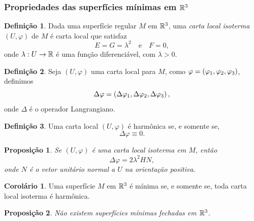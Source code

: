 \documentclass[12pt,a4paper]{beamer}
\newtheorem{proposicao}{Proposição}
\theoremstyle{definition}
\newtheorem{definicao}{Definição}
\newtheorem{corolario}{Corolário}
\begin{document}
\begin{frame}[allowframebreaks]
	\frametitle{Propriedades das superfícies mínimas em $\mathbb R^3$}
	
	\begin{definicao}
		Dada uma superfície regular $M$ em $\mathbb R^3$, uma \emph{carta local isoterma} $(U, \varphi)$ de $M$ é carta local que satisfaz
		\begin{equation*}
		E = G = \lambda^2 \quad \text{e} \quad F=0,
		\end{equation*}
		onde $\lambda: U \rightarrow \mathbb R$ é uma função diferenciável, com $\lambda > 0$.
	\end{definicao}
	
	\begin{definicao}
		Seja $(U, \varphi)$ uma carta local para $M$, como $\varphi = \left( \varphi_1, \varphi_2, \varphi_3 \right)$, definimos
		\begin{equation*}
		\Delta \varphi = \left( \Delta \varphi_1, \Delta \varphi_2, \Delta \varphi_3 \right),
		\end{equation*}
		onde $\Delta$ é o operador Langrangiano.
	\end{definicao}

	\begin{definicao}
		Uma carta local $(U,\varphi)$ é harmônica se, e somente se,
		\begin{equation*}
		\Delta \varphi \equiv 0.
		\end{equation*}
	\end{definicao}
	
	\begin{proposicao}
		Se $(U, \varphi)$ é uma carta local isoterma em $M$, então 
		\begin{equation*}
		\Delta \varphi = 2 \lambda^2 H N,
		\end{equation*}
		onde $N$ é o vetor unitário normal a $U$ na orientação positiva.
	\end{proposicao}
	
	\begin{corolario}
		Uma superfície $M$ em $\mathbb R^3$ é mínima se, e somente se, toda carta local isoterma é harmônica.
	\end{corolario}

	\begin{proposicao}
		Não existem superfícies mínimas fechadas em $\mathbb R^3$.
	\end{proposicao}
	
\end{frame}
\end{document}

